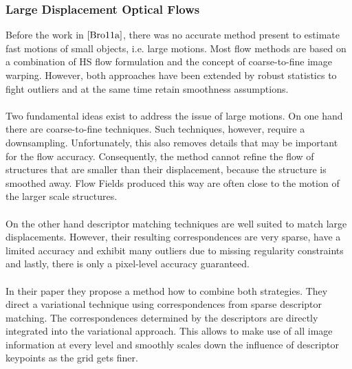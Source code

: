 \subsubsection{Large Displacement Optical Flows}
\label{sec:ldof_flows}
Before the work in $\cite{Bro11a}$, there was no accurate method present to estimate fast motions of small objects, i.e. large motions. Most flow methods are based on a combination of HS flow formulation and the concept of coarse-to-fine image warping. However, both approaches have been extended by robust statistics to fight outliers and at the same time retain smoothness assumptions. \\ \\
Two fundamental ideas exist to address the issue of large motions. On one hand there are coarse-to-fine techniques. Such techniques, however, require a downsampling. Unfortunately, this also removes details that may be important for the flow accuracy. Consequently, the method cannot refine the flow of structures that are smaller than their displacement, because the structure is smoothed away. Flow Fields produced this way are often close to the motion of the larger scale structures. \\ \\
On the other hand descriptor matching techniques are well suited to match large displacements. However, their resulting correspondences are very sparse, have a limited accuracy and exhibit many outliers due to missing regularity constraints and lastly, there is only a pixel-level accuracy guaranteed. \\ \\
In their paper they propose a method how to combine both strategies. They direct a variational technique using correspondences from sparse descriptor matching. The correspondences determined by the descriptors are directly integrated into the variational approach. This allows to make use of all image information at every level and smoothly scales down the influence of descriptor keypoints as the grid gets finer.

